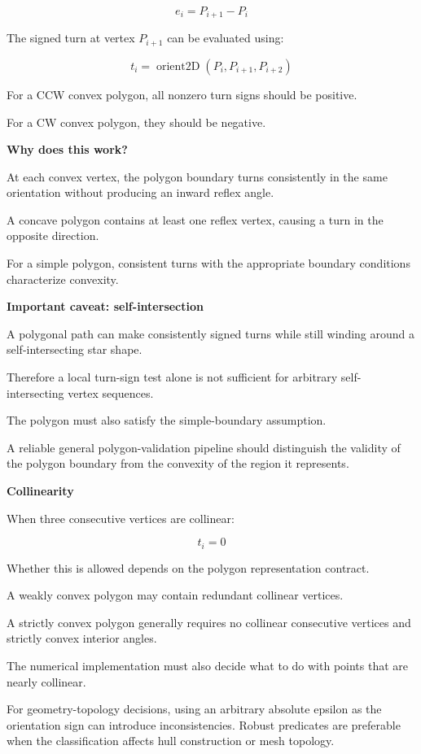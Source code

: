 \[
e_i=P_{i+1}-P_i
\]

The signed turn at vertex \(P_{i+1}\) can be evaluated using:

\[
\boxed{ t_i=\operatorname{orient2D}(P_i,P_{i+1},P_{i+2}) }
\]

For a CCW convex polygon, all nonzero turn signs should be positive.

For a CW convex polygon, they should be negative.

\textbf{Why does this work?}

At each convex vertex, the polygon boundary turns consistently in the same orientation without producing an inward reflex angle.

A concave polygon contains at least one reflex vertex, causing a turn in the opposite direction.

For a simple polygon, consistent turns with the appropriate boundary conditions characterize convexity.

\textbf{Important caveat: self-intersection}

A polygonal path can make consistently signed turns while still winding around a self-intersecting star shape.

Therefore a local turn-sign test alone is not sufficient for arbitrary self-intersecting vertex sequences.

The polygon must also satisfy the simple-boundary assumption.

A reliable general polygon-validation pipeline should distinguish the validity of the polygon boundary from the convexity of the region it represents.

\textbf{Collinearity}

When three consecutive vertices are collinear:

\[
t_i=0
\]

Whether this is allowed depends on the polygon representation contract.

A weakly convex polygon may contain redundant collinear vertices.

A strictly convex polygon generally requires no collinear consecutive vertices and strictly convex interior angles.

The numerical implementation must also decide what to do with points that are nearly collinear.

For geometry-topology decisions, using an arbitrary absolute epsilon as the orientation sign can introduce inconsistencies. Robust predicates are preferable when the classification affects hull construction or mesh topology.

